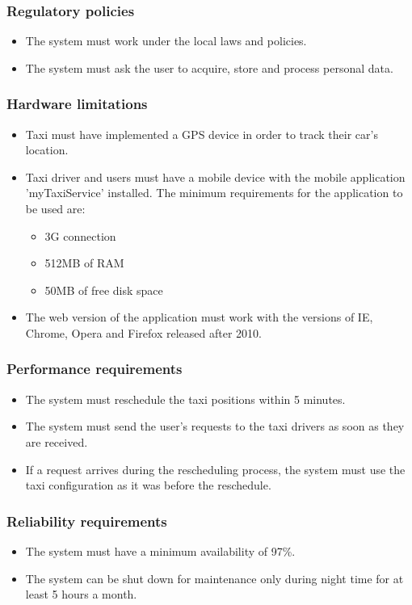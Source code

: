 \subsubsection{Regulatory policies}
	\begin{itemize}
		\item The system must work under the local laws and policies.
		\item The system must ask the user to acquire, store and process personal data. 
	\end{itemize}
	
\subsubsection{Hardware limitations}
	\begin{itemize}
		\item Taxi must have implemented a GPS device in order to track their car's location.
		\item Taxi driver and users must have a mobile device with the mobile application 'myTaxiService' installed. The minimum requirements for the application to be used are: 
		\begin{itemize}
			\item 3G connection
			\item 512MB of RAM
			\item 50MB of free disk space
		\end{itemize}
		\item The web version of the application must work with the versions of IE, Chrome, Opera and Firefox released after 2010.
	\end{itemize}

\subsubsection{Performance requirements}
	\begin{itemize}
		\item The system must reschedule the taxi positions within 5 minutes.
		\item The system must send the user's requests to the taxi drivers as soon as they are received.
		\item If a request arrives during the rescheduling process, the system must use the taxi configuration as it was before the reschedule.
	\end{itemize}

\subsubsection{Reliability requirements}
	\begin{itemize}
		\item The system must have a minimum availability of 97\%.
		\item The system can be shut down for maintenance only during night time for at least 5 hours a month.
	\end{itemize}

